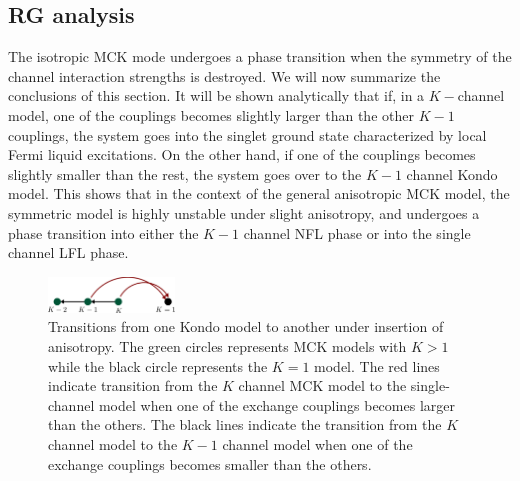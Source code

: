 \documentclass[reprint,prb,superscriptaddress]{revtex4-2}
\begin{document}
\subsection{RG analysis}
The isotropic MCK mode undergoes a phase transition when the symmetry of the channel interaction strengths is destroyed. We will now summarize the conclusions of this section. It will be shown analytically that if, in a \(K-\)channel model, one of the couplings becomes slightly larger than the other \(K-1\) couplings, the system goes into the singlet ground state characterized by local Fermi liquid excitations. On the other hand, if one of the couplings becomes slightly smaller than the rest, the system goes over to the \(K-1\) channel Kondo model. {This shows that in the context of the general anisotropic MCK model, the symmetric model is highly unstable under slight anisotropy, and undergoes a phase transition into either the \(K-1\) channel NFL phase or into the single channel LFL phase.}
\begin{figure}[!htpb]
	\centering
	\includegraphics[width=0.3\textwidth]{plt/iqpt.pdf}
	\caption{Transitions from one Kondo model to another under insertion of anisotropy. The green circles represents MCK models with \(K>1\) while the black circle represents the \(K=1\) model. The red lines indicate transition from the \(K\) channel MCK model to the single-channel model when one of the exchange couplings becomes larger than the others. The black lines indicate the transition from the \(K\) channel model to the \(K-1\) channel model when one of the exchange couplings becomes smaller than the others.}
	\label{fig:-iqpt-pdf}
\end{figure}
\end{document}

